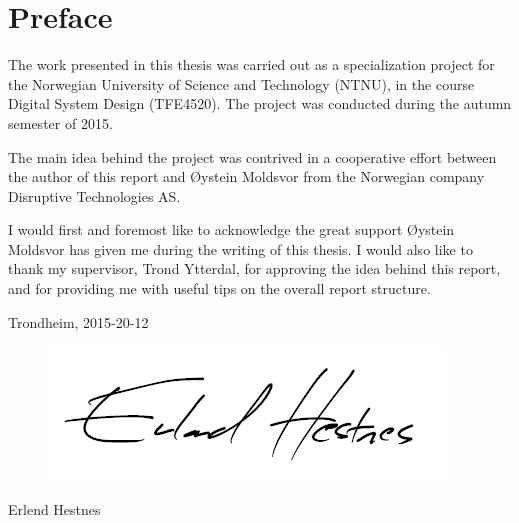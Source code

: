 \section*{Preface}

The work presented in this thesis was carried out as a specialization project for the Norwegian University of Science and Technology (NTNU), in the course Digital System Design (TFE4520). The project was conducted during the autumn semester of 2015.  

The main idea behind the project was contrived in a cooperative effort between the author of this report and Øystein Moldsvor from the Norwegian company Disruptive Technologies AS.

I would first and foremost like to acknowledge the great support Øystein Moldsvor has given me during the writing of this thesis. I would also like to thank my supervisor, Trond Ytterdal, for approving the idea behind this report, and for providing me with useful tips on the overall report structure. 

\begin{center}
Trondheim, 2015-20-12\\[1pc]
\begin{figure}[h]
\centering
\includegraphics[scale=0.5]{fig/underskrift.png}
\label{fig:underskrift}
\end{figure}
Erlend Hestnes
\end{center}